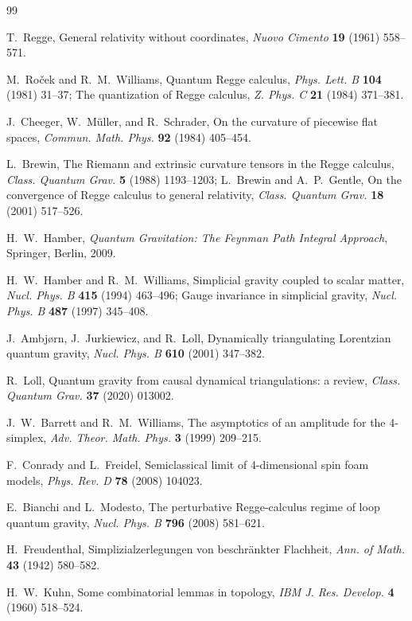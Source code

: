 \documentclass[11pt]{article}
\theoremstyle{definition}
\theoremstyle{remark}
\begin{document}
\begin{thebibliography}{99}

T.~Regge,
General relativity without coordinates,
\emph{Nuovo Cimento} \textbf{19} (1961) 558--571.

M.~Ro\v{c}ek and R.~M.~Williams,
Quantum Regge calculus,
\emph{Phys. Lett. B} \textbf{104} (1981) 31--37;
The quantization of Regge calculus,
\emph{Z. Phys. C} \textbf{21} (1984) 371--381.

J.~Cheeger, W.~M\"uller, and R.~Schrader,
On the curvature of piecewise flat spaces,
\emph{Commun. Math. Phys.} \textbf{92} (1984) 405--454.

L.~Brewin,
The Riemann and extrinsic curvature tensors in the Regge calculus,
\emph{Class. Quantum Grav.} \textbf{5} (1988) 1193--1203;
L.~Brewin and A.~P.~Gentle,
On the convergence of Regge calculus to general relativity,
\emph{Class. Quantum Grav.} \textbf{18} (2001) 517--526.

H.~W.~Hamber,
\emph{Quantum Gravitation: The Feynman Path Integral Approach},
Springer, Berlin, 2009.

H.~W.~Hamber and R.~M.~Williams,
Simplicial gravity coupled to scalar matter,
\emph{Nucl. Phys. B} \textbf{415} (1994) 463--496;
Gauge invariance in simplicial gravity,
\emph{Nucl. Phys. B} \textbf{487} (1997) 345--408.

J.~Ambj{\o}rn, J.~Jurkiewicz, and R.~Loll,
Dynamically triangulating Lorentzian quantum gravity,
\emph{Nucl. Phys. B} \textbf{610} (2001) 347--382.

R.~Loll,
Quantum gravity from causal dynamical triangulations: a review,
\emph{Class. Quantum Grav.} \textbf{37} (2020) 013002.

J.~W.~Barrett and R.~M.~Williams,
The asymptotics of an amplitude for the 4-simplex,
\emph{Adv. Theor. Math. Phys.} \textbf{3} (1999) 209--215.

F.~Conrady and L.~Freidel,
Semiclassical limit of 4-dimensional spin foam models,
\emph{Phys. Rev. D} \textbf{78} (2008) 104023.

E.~Bianchi and L.~Modesto,
The perturbative Regge-calculus regime of loop quantum gravity,
\emph{Nucl. Phys. B} \textbf{796} (2008) 581--621.

H.~Freudenthal,
Simplizialzerlegungen von beschr\"ankter Flachheit,
\emph{Ann. of Math.} \textbf{43} (1942) 580--582.

H.~W.~Kuhn,
Some combinatorial lemmas in topology,
\emph{IBM J. Res. Develop.} \textbf{4} (1960) 518--524.

\end{thebibliography}
\end{document}
